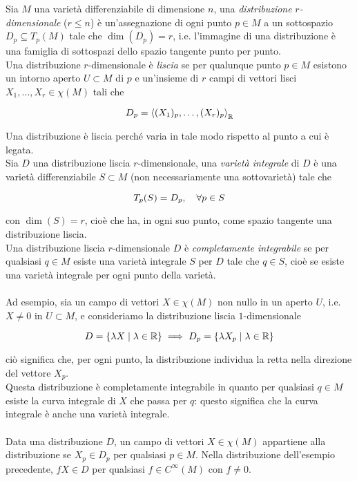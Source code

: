Sia $ M $ una varietà differenziabile di dimensione $ n $, una \textit{distribuzione} $ r $\textit{-dimensionale} ($ r \leqslant n $) è un'assegnazione di ogni punto $ p \in M $ a un sottospazio $ D_{p} \subseteq T_{p}(M) $ tale che $ \dim(D_{p}) = r $, i.e. l'immagine di una distribuzione è una famiglia di sottospazi dello spazio tangente punto per punto. \\
Una distribuzione $ r $-dimensionale è \textit{liscia} se per qualunque punto $ p \in M $ esistono un intorno aperto $ U \subset M $ di $ p $ e un'insieme di $ r $ campi di vettori lisci $ X_{1},\dots,X_{r} \in \chi(M) $ tali che

\begin{equation}
	D_{p} = \ev{ (X_{1})_{p}, \dots, (X_{r})_{p} }_{\R}
\end{equation}

Una distribuzione è liscia perché varia in tale modo rispetto al punto a cui è legata. \\
Sia $ D $ una distribuzione liscia $ r $-dimensionale, una \textit{varietà integrale} di $ D $ è una varietà differenziabile $ S \subset M $ (non necessariamente una sottovarietà) tale che

\begin{equation}
	T_{p}(S) = D_{p} \qcomma \forall p \in S
\end{equation}

con $ \dim(S) = r $, cioè che ha, in ogni suo punto, come spazio tangente una distribuzione liscia. \\
Una distribuzione liscia $ r $-dimensionale $ D $ è \textit{completamente integrabile} se per qualsiasi $ q \in M $ esiste una varietà integrale $ S $ per $ D $ tale che $ q \in S $, cioè se esiste una varietà integrale per ogni punto della varietà. \\ \\
%
Ad esempio, sia un campo di vettori $ X \in \chi(M) $ non nullo in un aperto $ U $, i.e. $ X \neq 0 $ in $ U \subset M $, e consideriamo la distribuzione liscia $ 1 $-dimensionale

\begin{equation}
	D = \{ \lambda X \mid \lambda \in \R \} %
	\implies %
	D_{p} = \{ \lambda X_{p} \mid \lambda \in \R \}
\end{equation}

ciò significa che, per ogni punto, la distribuzione individua la retta nella direzione del vettore $ X_{p} $. \\
Questa distribuzione è completamente integrabile in quanto per qualsiasi $ q \in M $ esiste la curva integrale di $ X $ che passa per $ q $: questo significa che la curva integrale è anche una varietà integrale. \\ \\
%
Data una distribuzione $ D $, un campo di vettori $ X \in \chi(M) $ appartiene alla distribuzione se $ X_{p} \in D_{p} $ per qualsiasi $ p \in M $. Nella distribuzione dell'esempio precedente, $ f X \in D $ per qualsiasi $ f \in C^{\infty}(M) $ con $ f \neq 0 $.

